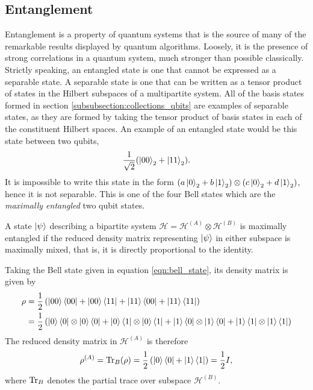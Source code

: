 \subsection{Entanglement}
Entanglement is a property of quantum systems that is the source of many of the remarkable results displayed by quantum algorithms.
Loosely, it is the presence of strong correlations in a quantum system, much stronger than possible classically.
Strictly speaking, an entangled state is one that cannot be expressed as a separable state.
A separable state is one that can be written as a tensor product of states in the Hilbert subspaces of a multipartite system.
All of the basis states formed in section \ref{subsubsection:collections_qbits} are examples of separable states, as they are formed by taking the tensor product of basis states in each of the constituent Hilbert spaces.
An example of an entangled state would be this state between two qubits,
\begin{equation}
    \label{eqn:bell_state}
    \frac{1}{\sqrt{2}}(\ket{00}_2 + \ket{11}_2).
\end{equation}
It is impossible to write this state in the form $\left(a\ket{0}_2 + b\ket{1}_2\right) \otimes \left(c\ket{0}_2 + d\ket{1}_2 \right)$, hence it is not separable.
This is one of the four Bell states which are the \emph{maximally entangled} two qubit states.
\begin{definition}
    A state $\ket{\psi}$ describing a bipartite system $\mathcal{H} = \mathcal{H}^{(A)} \otimes \mathcal{H}^{(B)}$ is maximally entangled if the reduced density matrix representing $\ket{\psi}$ in either subspace is maximally mixed, that is, it is directly proportional to the identity.
\end{definition}
Taking the Bell state given in equation \ref{eqn:bell_state}, its density matrix is given by
\begin{align}
    \rho &= \frac{1}{2}\left(\ket{00}\bra{00} + \ket{00}\bra{11} + \ket{11}\bra{00} + \ket{11}\bra{11}\right)\\
    &= \frac{1}{2}\left(\ket{0}\bra{0}\otimes\ket{0}\bra{0} + \ket{0}\bra{1}\otimes\ket{0}\bra{1} + \ket{1}\bra{0}\otimes\ket{1}\bra{0} + \ket{1}\bra{1}\otimes\ket{1}\bra{1}\right)
\end{align}
The reduced density matrix in $\mathcal{H}^{(A)}$ is therefore
\begin{equation}
    \rho^{(A)} = \operatorname{Tr}_B(\rho) = \frac{1}{2}\left(\ket{0}\bra{0} + \ket{1}\bra{1}\right) = \frac{1}{2}I,
\end{equation}
where $\operatorname{Tr}_B$ denotes the partial trace over subspace $\mathcal{H}^{(B)}$.

